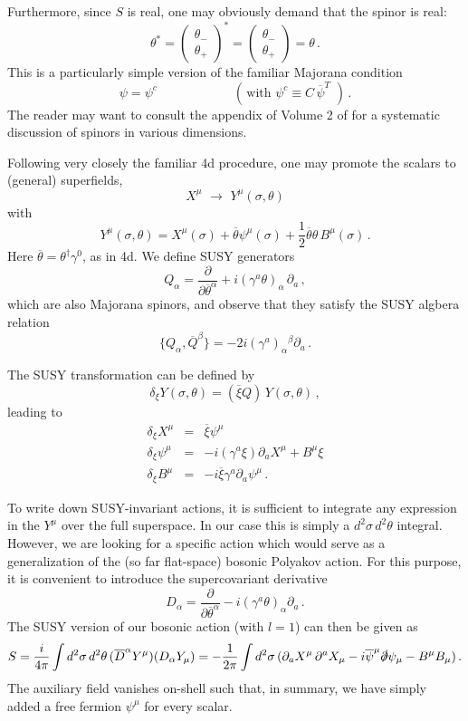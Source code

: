\documentclass[12pt]{article}
\newcommand{\be}{\begin{equation}}
\newcommand{\ee}{\end{equation}}
\newcommand{\bea}{\begin{eqnarray}}
\newcommand{\eea}{\end{eqnarray}}
\newcommand{\ol}{\overline}
\numberwithin{equation}{section}
\begin{document}
Furthermore, since $S$ is real, one may obviously demand that the spinor is real:
\be
\theta^*=\left(\begin{array}{c}\theta_-\\\theta_+\end{array}\right)^*
=\left(\begin{array}{c}\theta_-\\\theta_+\end{array}\right)=\theta\,.
\ee
This is a particularly simple version of the familiar Majorana condition
\be
\psi=\psi^c \qquad\qquad \qquad (\,\mbox{with}\,\,\psi^c\equiv C\,\ol{\psi}^T\,\,)\,.
\ee
The reader may want to consult the appendix of Volume 2 of \cite{Polchinski:1998rq} for a systematic discussion of spinors in various dimensions. 

Following very closely the familiar 4d procedure, one may promote the scalars to (general) superfields,
\be
X^\mu\,\,\to\,\,Y^\mu(\sigma,\theta)
\ee
with 
\be
Y^\mu(\sigma,\theta)=X^\mu(\sigma)+\ol{\theta}\psi^\mu(\sigma)+\frac{1}{2} \ol{\theta}\theta\,B^\mu(\sigma)\,.
\ee
Here $\ol{\theta}=\theta^\dagger\gamma^0$, as in 4d. We define SUSY generators
\be
Q_\alpha=\frac{\partial}{\partial\ol{\theta}^\alpha}+i(\gamma^a\theta)_\alpha\,\partial_a\,,
\ee
which are also Majorana spinors, and observe that they satisfy the SUSY algbera
relation
\be
\{Q_\alpha,\ol{Q}^\beta\}=-2i(\gamma^a)_\alpha{}^\beta\partial_a\,.
\ee

The SUSY transformation can be defined by
\be
\delta_\xi Y(\sigma,\theta)=(\ol{\xi}Q)\,Y(\sigma,\theta)\,,
\ee
leading to
\bea
\delta_\xi X^\mu &=& \ol{\xi}\psi^\mu
\\
\delta_\xi \psi^\mu &=& -i(\gamma^a \xi)\partial_a X^\mu+B^\mu\xi
\\
\delta_\xi B^\mu &=& -i\ol{\xi}\gamma^a\partial_a \psi^\mu\,.
\eea

To write down SUSY-invariant actions, it is sufficient to integrate any expression in the $Y^\mu$ over the full superspace. In our case this is simply a $d^2\sigma\,d^2\theta$ integral. However, we are looking for a specific action which would serve as a generalization of the (so far flat-space) bosonic Polyakov action. For this purpose, it is convenient to introduce the supercovariant derivative
\be
D_\alpha=\frac{\partial}{\partial \ol{\theta}^\alpha}-i(\gamma^a\theta)_\alpha
\partial_a\,.
\ee
The SUSY version of our bosonic action (with $l=1$) can then be given as
\be
S=\frac{i}{4\pi}\int d^2\sigma\, d^2\theta\, (\ol{D}^\alpha Y^\mu)(D_\alpha Y_\mu)=-\frac{1}{2\pi}\int d^2\sigma\,(\partial_a X^\mu\,\partial^a X_\mu-i\ol{\psi}^\mu\slashed{\partial}\psi_\mu-B^\mu B_\mu)\,.
\ee
The auxiliary field vanishes on-shell such that, in summary, we have simply added a free fermion $\psi^\mu$ for every scalar. 
\end{document}
